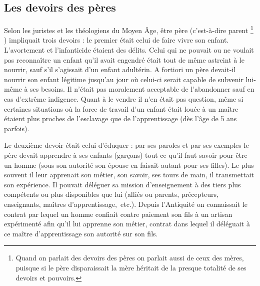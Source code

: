  \subsection{Les devoirs des pères}
 
 Selon les juristes et les théologiens du Moyen Âge, être père (c'est-à-dire parent%
\footnote{Quand on parlait des devoirs des pères on parlait aussi de ceux des mères, puisque si le père disparaissait la mère héritait de la presque totalité de ses devoirs et pouvoirs.}%
) impliquait trois devoirs : 
le premier était celui de 
faire vivre son enfant. L'avortement et l'infanticide étaient des délits. Celui qui ne pouvait ou ne voulait pas reconnaître un enfant qu'il avait engendré était tout de même astreint à le nourrir, sauf s'il s'agissait d'un enfant adultérin. A fortiori un père devait-il nourrir son enfant légitime jusqu'au jour où celui-ci serait capable de subvenir lui-même à ses besoins. Il n'était pas moralement acceptable de l'abandonner sauf en cas d'extrême indigence. Quant à le vendre il n'en était pas question, même si certaines situations où la force de travail d'un enfant était louée à un maître étaient plus proches de l'esclavage que de l'apprentissage (dès l'âge de 5 ans parfois).

 Le deuxième devoir était celui d'éduquer : par ses paroles et par ses exemples le père devait apprendre à ses enfants (garçons) tout ce qu'il faut savoir pour être un homme (sous son autorité son épouse en faisait autant pour ses filles). Le plus souvent il leur apprenait son métier, son savoir, ses tours de main, il transmettait son expérience. Il pouvait déléguer sa mission d'enseignement à des tiers plus compétents ou plus disponibles que lui (alliés ou parents, précepteurs, enseignants, maîtres d'apprentissage,~etc.). Depuis l'Antiquité on connaissait le contrat par lequel un homme confiait contre paiement son fils à un artisan expérimenté afin qu'il lui apprenne son métier, contrat dans lequel il déléguait à ce maître d'apprentissage son autorité sur son fils.


